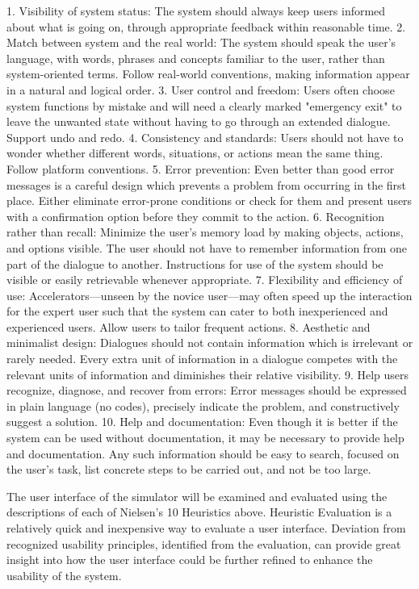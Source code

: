 \documentclass{article}
\begin{document}
1. Visibility of system status:
The system should always keep users informed about what is going on, through appropriate feedback within reasonable time.
2. Match between system and the real world:
The system should speak the user's language, with words, phrases and concepts familiar to the user, rather than system-oriented terms. Follow real-world conventions, making information appear in a natural and logical order.
3. User control and freedom:
Users often choose system functions by mistake and will need a clearly marked "emergency exit" to leave the unwanted state without having to go through an extended dialogue. Support undo and redo.
4. Consistency and standards:
Users should not have to wonder whether different words, situations, or actions mean the same thing. Follow platform conventions.
5. Error prevention:
Even better than good error messages is a careful design which prevents a problem from occurring in the first place. Either eliminate error-prone conditions or check for them and present users with a confirmation option before they commit to the action.
6. Recognition rather than recall:
Minimize the user's memory load by making objects, actions, and options visible. The user should not have to remember information from one part of the dialogue to another. Instructions for use of the system should be visible or easily retrievable whenever appropriate.
7. Flexibility and efficiency of use:
Accelerators—unseen by the novice user—may often speed up the interaction for the expert user such that the system can cater to both inexperienced and experienced users. Allow users to tailor frequent actions.
8. Aesthetic and minimalist design:
Dialogues should not contain information which is irrelevant or rarely needed. Every extra unit of information in a dialogue competes with the relevant units of information and diminishes their relative visibility.
9. Help users recognize, diagnose, and recover from errors:
Error messages should be expressed in plain language (no codes), precisely indicate the problem, and constructively suggest a solution.
10. Help and documentation:
Even though it is better if the system can be used without documentation, it may be necessary to provide help and documentation. Any such information should be easy to search, focused on the user's task, list concrete steps to be carried out, and not be too large.

The user interface of the simulator will be examined and evaluated using the descriptions of each of Nielsen’s 10 Heuristics above. Heuristic Evaluation is a relatively quick and inexpensive way to evaluate a user interface. Deviation from recognized usability principles, identified from the evaluation, can provide great insight into how the user interface could be further refined to enhance the usability of the system.
\end{document}
